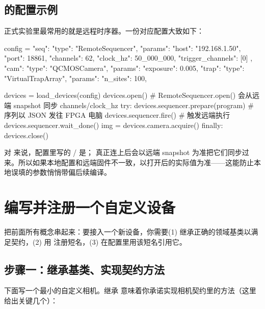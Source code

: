 \documentclass[11pt,oneside,openany]{book}
\begin{document}
\subsection{ 的配置示例}

正式实验里最常用的就是远程时序器。一份对应配置大致如下：

\begin{codeblock}[Python]
config = {
    "seq": {
        "type": "RemoteSequencer",
        "params": {
            "host": "192.168.1.50",
            "port": 18861,
            "channels": 62,
            "clock_hz": 50_000_000,
            "trigger_channels": [0]
        }
    },
    "cam": {"type": "QCMOSCamera", "params": {"exposure": 0.005}},
    "trap": {"type": "VirtualTrapArray", "params": {"n_sites": 100}},
}

devices = load_devices(config)
devices.open()      # RemoteSequencer.open() 会从远端 snapshot 同步 channels/clock_hz
try:
    devices.sequencer.prepare(program)   # 序列以 JSON 发往 FPGA 电脑
    devices.sequencer.fire()             # 触发远端执行
    devices.sequencer.wait_done()
    img = devices.camera.acquire()
finally:
    devices.close()
\end{codeblock}

\begin{notebox}
对  来说，配置里写的 / 是； 真正连上后会以远端 snapshot 为准把它们同步过来。所以如果本地配置和远端固件不一致，以打开后的实际值为准——这能防止本地误填的参数悄悄带偏后续编译。
\end{notebox}

\section{编写并注册一个自定义设备}

把前面所有概念串起来：要接入一个新设备，你需要(1) 继承正确的领域基类以满足契约，(2) 用  注册短名，(3) 在配置里用该短名引用它。

\subsection{步骤一：继承基类、实现契约方法}

下面写一个最小的自定义相机。继承  意味着你承诺实现相机契约里的方法（这里给出关键几个）：
\end{document}

